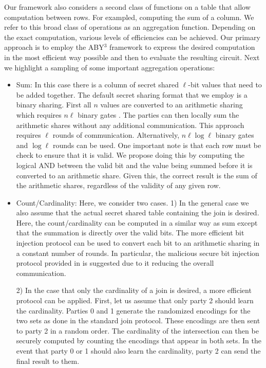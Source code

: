 Our framework also considers a second class of functions on a table that allow computation between rows. For exampled, computing the sum of a column. We refer to this broad class of operations as an aggregation function. Depending on the exact computation, various levels of efficiencies can be achieved. Our primary approach is to employ the ABY$^3$ framework \cite{aby3} to express the desired computation in the most efficient way possible and then to evaluate the resulting circuit. Next we highlight a sampling of some important aggregation operations:
\begin{itemize}
	\item Sum: In this case there is a column of secret shared $\ell$-bit values that need to be added together.  The default secret sharing format that we employ is a binary sharing. First all $n$ values are converted to an arithmetic sharing which requires $n\ell$ binary gates \cite{aby3}. The parties can then locally sum the arithmetic shares without any additional communication. This approach requires $\ell$ rounds of communication. Alternatively, $n\ell\log \ell$ binary gates and $\log \ell$ rounds can be used\cite{aby3}. One important note is that each row must be check to ensure that it is valid. We propose doing this by computing the logical AND between the valid bit and the value being summed before it is converted to an arithmetic share. Given this, the correct result is the sum of the arithmetic shares, regardless of the validity of any given row.
	
	\item Count/Cardinality: Here, we consider two cases. 1) In the general case we also assume that the actual secret shared table containing the join is desired. Here, the count/cardinality can be computed in a similar way as sum except that the summation is directly over the valid bits. The more efficient bit injection protocol\cite{aby3} can be used to convert each bit to an arithmetic sharing in a constant number of rounds. In particular, the malicious secure bit injection protocol provided in \cite{aby3} is suggested due to it reducing the overall communication. 
	
	2) In the case that only the cardinality of a join is desired, a more efficient protocol can be applied. First, let us assume that only party 2 should learn the cardinality. Parties 0 and 1 generate the randomized encodings for the two sets as done in the standard join protocol. These encodings are then sent to party 2 in a random order. The cardinality of the intersection can then be securely computed by counting the encodings that appear in both sets. In the event that party 0 or 1 should also learn the cardinality, party 2 can send the final result to them. 
	

\end{itemize}
